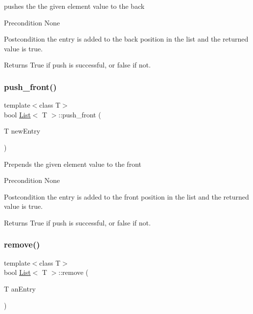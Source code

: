 pushes the the given element value to the back \begin{DoxyPrecond}{Precondition}
None 
\end{DoxyPrecond}
\begin{DoxyPostcond}{Postcondition}
the entry is added to the back position in the list and the returned value is true. 
\end{DoxyPostcond}
\begin{DoxyReturn}{Returns}
True if push is successful, or false if not. 
\end{DoxyReturn}
\mbox{\label{class_list_a7ad16a889175f6bbb32aeb295c8f30c3}} 
\subsubsection{\texorpdfstring{push\+\_\+front()}{push\_front()}}
{\footnotesize\ttfamily template$<$class T$>$ \\
bool \hyperlink{class_list}{List}$<$ T $>$\+::push\+\_\+front (\begin{DoxyParamCaption}\item[{T}]{new\+Entry }\end{DoxyParamCaption})}

Prepends the given element value to the front \begin{DoxyPrecond}{Precondition}
None 
\end{DoxyPrecond}
\begin{DoxyPostcond}{Postcondition}
the entry is added to the front position in the list and the returned value is true. 
\end{DoxyPostcond}
\begin{DoxyReturn}{Returns}
True if push is successful, or false if not. 
\end{DoxyReturn}
\mbox{\label{class_list_a91f71c17d25baa99323e99297695492f}} 
\subsubsection{\texorpdfstring{remove()}{remove()}}
{\footnotesize\ttfamily template$<$class T$>$ \\
bool \hyperlink{class_list}{List}$<$ T $>$\+::remove (\begin{DoxyParamCaption}\item[{T}]{an\+Entry }\end{DoxyParamCaption})}

